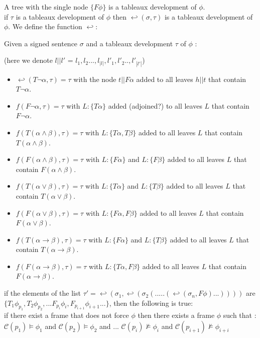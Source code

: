 \documentclass[runningheads]{llncs}
\begin{document}
    
\begin{definition}
    A tree with the single node $\{F \phi \}$ is a tableaux development of $\phi$. \\

    if $\tau$ is a tableaux development of $\phi$ then $\hookleftarrow(\sigma,\tau)$ is a tableaux development of $\phi$.
We define the function $\hookleftarrow$: 
    
    Given a signed sentence $\sigma$ and a tableaux development $\tau$ of $\phi$ :

    
   
    (here we denote $l||l'$ = $l_1,l_2...,l_{|l|}, l'_1,l'_2..,l'_{|l'|} $)

    
    \begin{itemize}
        \item $\hookleftarrow(T \neg \alpha,\tau) = \tau$ with the node $t || F \alpha $ 
        added to all leaves $h||t$ that contain $T\neg \alpha$.
        \item $f(F \neg \alpha,\tau) = \tau$ with $L : \{T \alpha\}$ 
        added (adjoined?) to all leaves $L$ that contain $F \neg \alpha$.
        \item $f(T (\alpha \land \beta),\tau) = \tau$ with $L : \{T \alpha, T \beta\}$ 
        added to all leaves $L$ that contain $T (\alpha \land \beta)$.
        \item $f(F (\alpha \land \beta),\tau) = \tau$ with $L : \{F \alpha\}$ and $L : \{F \beta\}$ 
        added to all leaves $L$ that contain $F (\alpha \land \beta)$.
        \item $f(T (\alpha \lor \beta),\tau) = \tau$ with $L : \{T \alpha\}$ and $L : \{T \beta\}$ 
        added to all leaves $L$ that contain $T (\alpha \lor \beta)$.
        \item $f(F (\alpha \lor \beta),\tau) = \tau$ with $L : \{F \alpha, F \beta\}$ 
        added to all leaves $L$ that contain $F (\alpha \lor \beta)$.
        \item $f(T (\alpha \to \beta),\tau) = \tau$ with $L : \{F \alpha\}$ and $L : \{T \beta\}$ 
        added to all leaves $L$ that contain $T (\alpha \to \beta)$.
        \item $f(F (\alpha \to \beta),\tau) = \tau$ with $L : \{T \alpha, F \beta\}$ 
        added to all leaves $L$ that contain $F (\alpha \to \beta)$.
     \end{itemize}
\end{definition}

\begin{theorem}
    if the elements of the list $ \tau' = \hookleftarrow (\sigma_1,\hookleftarrow(\sigma_2(.....(\hookleftarrow(\sigma_n , F\phi)...)))) $ 
    are  $\{ T_{1}\phi_{p_1}, T_{2}\phi_{p_2}, ... F_{p_i}\phi_{i}, F_{p_{i+1}}\phi_{i+1}...\} $, then the following is true: \\
    if there exist a frame that does not force $\phi$ then there exists a frame $\phi$ such that :
     $ \mathcal{C}(p_1) \vDash \phi_{1}$ and $ \mathcal{C}(p_{2}) \vDash \phi_{2}$ and ... $ \mathcal{C}(p_{i}) \nvDash \phi_{i}$  and $ \mathcal{C}(p_{i+1}) \nvDash \phi_{i+i}$
\end{theorem}
\end{document}
